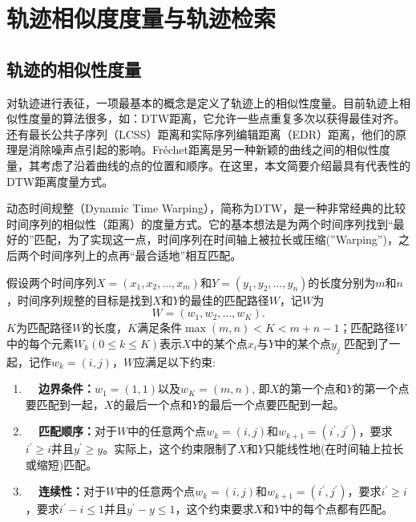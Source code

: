 \section{轨迹相似度度量与轨迹检索}

\subsection{轨迹的相似性度量}
对轨迹进行表征，一项最基本的概念是定义了轨迹上的相似性度量。目前轨迹上相似性度量的算法很多，如：DTW距离，它允许一些点重复多次以获得最佳对齐\cite{DTW,shokoohi2017generalizing}。还有最长公共子序列（LCSS）距离\cite{LCSS}和实际序列编辑距离（EDR）距离\cite{EDR}，他们的原理是消除噪声点引起的影响。Fr\'echet距离是另一种新颖的曲线之间的相似性度量，其考虑了沿着曲线\cite{Frechet}的点的位置和顺序。在这里，本文简要介绍最具有代表性的DTW距离度量方式。

动态时间规整（Dynamic Time Warping）\cite{DTW,senin2008dynamic}，简称为DTW，是一种非常经典的比较时间序列的相似性（距离）的度量方式。它的基本想法是为两个时间序列找到“最好的”匹配，为了实现这一点，时间序列在时间轴上被拉长或压缩(”Warping”)\cite{salvador2007toward}，之后两个时间序列上的点再“最合适地”相互匹配。

假设两个时间序列$X = \left( x _ { 1 } , x _ { 2 } , \ldots , x _ { m } \right)$和$Y = \left( y _ { 1 } , y _ { 2 } , \ldots , y _ { n } \right)$的长度分别为$m$和$n$，时间序列规整的目标是找到$X$和$Y$的最佳的匹配路径$W$，记$W$为
\begin{equation}
W = \left( w _ { 1 } , w _ { 2 } , \ldots , w _ { K } \right).
\end{equation}
$K$为匹配路径$W$的长度，$K$满足条件$\max ( m , n ) < K < m + n - 1$；匹配路径$W$中的每个元素$W _ { k } ( 0 \leq k \leq K )$表示$X$中的某个点$x_i$与$Y$中的某个点$y_j$ 匹配到了一起，记作$w _ { k } = ( i , j )$，$W$应满足以下约束:

\begin{enumerate}
    \item \textbf{~~边界条件：}$w_1 = ( 1,1 )$以及$w _ { K } = ( m , n )$, 即$X$的第一个点和$Y$的第一个点要匹配到一起，$X$的最后一个点和$Y$的最后一个点要匹配到一起。
    \item \textbf{~~匹配顺序：}对于$W$中的任意两个点$w _ { k } = ( i , j )$和$w _ { k + 1 } = \left( i ^ { \prime } , j ^ { \prime } \right)$，要求$i ^ { \prime } \geq i$并且$y ^ { \prime } \geq y$。实际上，这个约束限制了$X$和$Y$只能线性地(在时间轴上拉长或缩短)匹配。
    \item \textbf{~~连续性：}对于$W$中的任意两个点$w _ { k } = ( i , j )$和$w _ { k + 1 } = \left( i ^ { \prime } , j ^ { \prime } \right)$，要求$i ^ { \prime } \geq i$，要求$i ^ { \prime } - i \leq 1$并且$y ^ { \prime } - y \leq 1$，这个约束要求$X$和$Y$中的每个点都有匹配。
\end{enumerate}


